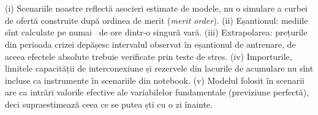 \section{}
%
{(i) Scenariile noastre reflectă asocieri estimate de modele, nu o simulare a curbei de ofertă construite după ordinea de merit (\emph{merit order}).
(ii) Eșantionul: mediile sînt calculate pe numai \NnSpike\ de ore dintr-o singură vară.
(iii) Extrapolarea: prețurile din perioada crizei depășesc intervalul observat în eșantionul de antrenare, de aceea efectele absolute trebuie verificate prin teste de stres.
(iv) Importurile, limitele capacității de interconexiune și rezervele din lacurile de acumulare nu sînt incluse ca instrumente în scenariile din notebook.
(v) Modelul folosit în scenarii are ca intrări valorile efective ale variabilelor fundamentale (previziune perfectă), deci supraestimează ceea ce se putea ști cu o zi înainte.}

\newpage
